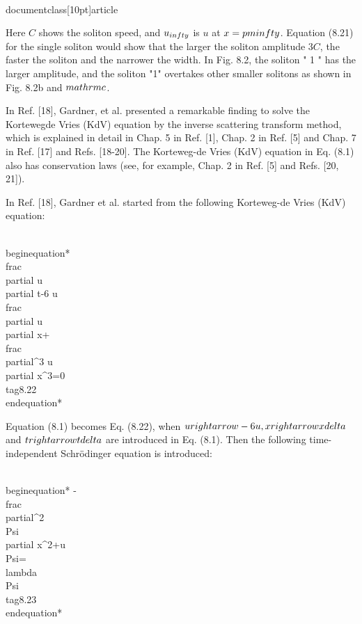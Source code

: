 \\documentclass[10pt]{article}
\begin{document}
{{{{{Here $C$ shows the soliton speed, and $u_{\\infty}$ is $u$ at $x= \\pm \\infty$. Equation (8.21) for the single soliton would show that the larger the soliton amplitude $3 C$, the faster the soliton and the narrower the width. In Fig. 8.2, the soliton " 1 " has the larger amplitude, and the soliton "1" overtakes other smaller solitons as shown in Fig. 8.2b and $\\mathrm{c}$.

In Ref. [18], Gardner, et al. presented a remarkable finding to solve the Kortewegde Vries (KdV) equation by the inverse scattering transform method, which is explained in detail in Chap. 5 in Ref. [1], Chap. 2 in Ref. [5] and Chap. 7 in Ref. [17] and Refs. [18-20]. The Korteweg-de Vries (KdV) equation in Eq. (8.1) also has conservation laws (see, for example, Chap. 2 in Ref. [5] and Refs. [20, 21]).

In Ref. [18], Gardner et al. started from the following Korteweg-de Vries (KdV) equation:


\\begin{equation*}
\\frac{\\partial u}{\\partial t}-6 u \\frac{\\partial u}{\\partial x}+\\frac{\\partial^{3} u}{\\partial x^{3}}=0 \\tag{8.22}
\\end{equation*}


Equation (8.1) becomes Eq. (8.22), when $u \\rightarrow-6 u, x \\rightarrow x \\delta$ and $t \\rightarrow t \\delta$ are introduced in Eq. (8.1). Then the following time-independent Schrödinger equation is introduced:


\\begin{equation*}
-\\frac{\\partial^{2} \\Psi}{\\partial x^{2}}+u \\Psi=\\lambda \\Psi \\tag{8.23}
\\end{equation*}


}}}}}
\end{document}
